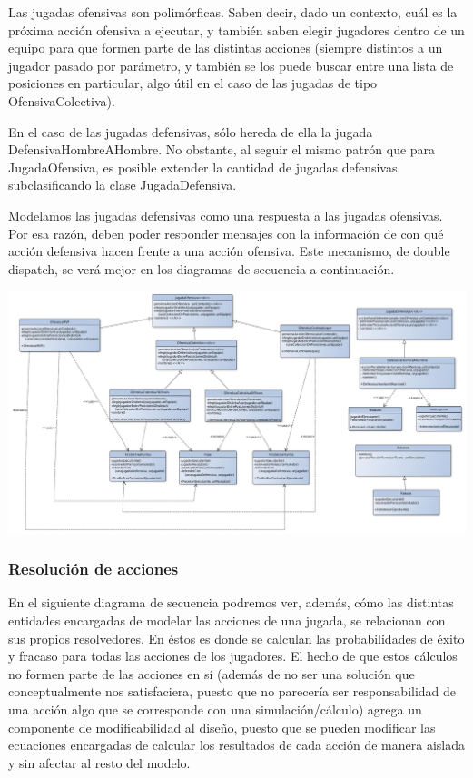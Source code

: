 Las jugadas ofensivas son polimórficas. Saben decir, dado un contexto, cuál es la próxima acción ofensiva a ejecutar, y también saben elegir jugadores dentro de un equipo para que formen parte de las distintas acciones (siempre distintos a un jugador pasado por parámetro, y también se los puede buscar entre una lista de posiciones en particular, algo útil en el caso de las jugadas de tipo OfensivaColectiva).

En el caso de las jugadas defensivas, sólo hereda de ella la jugada DefensivaHombreAHombre. No obstante, al seguir el mismo patrón que para JugadaOfensiva, es posible extender la cantidad de jugadas defensivas subclasificando la clase JugadaDefensiva. 

Modelamos las jugadas defensivas como una respuesta a las jugadas ofensivas. Por esa razón, deben poder responder mensajes con la información de con qué acción defensiva hacen frente a una acción ofensiva. Este mecanismo, de double dispatch, se verá mejor en los diagramas de secuencia a continuación.


\begin{center}
\includegraphics[scale=0.4, angle=90]{diseno/jugadasYAcciones.jpg}
\end{center}

\subsubsection{Resolución de acciones}
En el siguiente diagrama de secuencia podremos ver, además, cómo las distintas entidades encargadas de modelar las acciones de una jugada, se relacionan con sus propios resolvedores. En éstos es donde se calculan las probabilidades de éxito y fracaso para todas las acciones de los jugadores. El hecho de que estos cálculos no formen parte de las acciones en sí (además de no ser una solución que conceptualmente nos satisfaciera, puesto que no parecería ser responsabilidad de una acción algo que se corresponde con una simulación/cálculo) agrega un componente de modificabilidad al diseño, puesto que se pueden modificar las ecuaciones encargadas de calcular los resultados de cada acción de manera aislada y sin afectar al resto del modelo.

